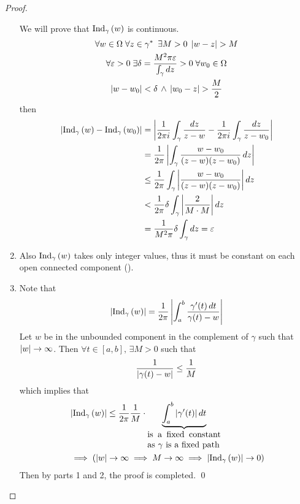 \documentclass[notoc,notitlepage]{tufte-book}
\begin{document}
\begin{proof}
\begin{enumerate}
		We will prove that $\operatorname{Ind}_{\gamma}\left( w \right)$ is continuous.
		\begin{gather*}
			\forall w \in \Omega \; \forall z \in \gamma^* \enspace \exists M > 0 \; \left|w - z\right| > M \\
			\forall \varepsilon > 0 \; \exists \delta = \frac{M^2 \pi \varepsilon}{ \int_{\gamma} \mathop{}\!d{z} } > 0 \; \forall w_0 \in \Omega \\
			\left|w - w_0\right| < \delta \, \land \, \left|w_0 - z\right| > \frac{M}{2}
		\end{gather*}
		then
		\begin{align*}
			\left|\operatorname{Ind}_{\gamma}\left( w \right) - \operatorname{Ind}_{\gamma}\left( w_0 \right)\right| &= \left|\frac{1}{2 \pi i} \int_{\gamma} \frac{\mathop{}\!d{z}}{z - w}	- \frac{1}{2 \pi i} \int_{\gamma} \frac{\mathop{}\!d{z}}{z - w_0} \right| \\
				&= \frac{1}{2 \pi} \left|\int_{\gamma} \frac{w - w_0}{(z - w)(z - w_0)} \mathop{}\!d{z} \right| \\
				&\leq \frac{1}{2 \pi} \int_{\gamma} \left|\frac{w - w_0}{(z - w)(z - w_0)} \right| \mathop{}\!d{z} \\
				&< \frac{1}{2 \pi} \delta \int_{\gamma} \left|\frac{2}{M \cdot M} \right| \mathop{}\!d{z} \\
				&= \frac{1}{M^2 \pi} \delta \int_{\gamma} \mathop{}\!d{z} = \varepsilon
		\end{align*}

		\item Also $\operatorname{Ind}_{\gamma}\left( w \right)$ takes only integer values, thus it must be constant on each open connected component ().

		\item Note that
		\begin{equation*}
			\left|\operatorname{Ind}_{\gamma}\left( w \right)\right| = \frac{1}{2 \pi} \left|\int_{a}^{b} \frac{\gamma'(t) \mathop{}\!d{t}}{\gamma(t) - w}\right|
		\end{equation*}
		Let $w$ be in the unbounded component in the complement of $\gamma$ such that $\left|w\right| \to \infty$. Then $\forall t \in [a, b], \, \exists M > 0$ such that
		\begin{equation*}
			\frac{1}{\left|\gamma(t) - w\right|} \leq \frac{1}{M}
		\end{equation*}
		which implies that
		\begin{align*}
			&\abs{\ind{w}{\gamma}} \leq \frac{1}{2 \pi} \frac{1}{M} \cdot \underbrace{\int_{a}^{b} \abs{\gamma'(t)} \dif{t}}_{\parbox{3cm}{is a fixed constant as $\gamma$ is a fixed path}} \\
			&\implies (\abs{w} \to \infty \implies M \to \infty \implies \abs{\ind{w}{\gamma}} \to 0)
		\end{align*}
		Then by parts 1 and 2, the proof is completed. \qed
	\end{enumerate}
\end{proof}
\end{document}
